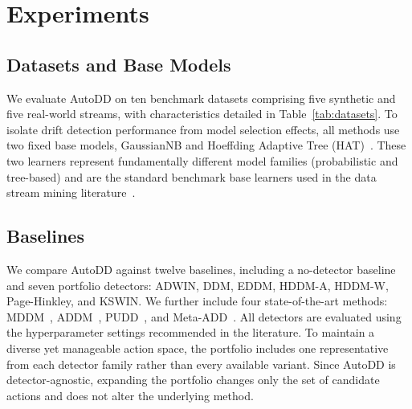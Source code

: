 \documentclass[conference]{IEEEtran}
\begin{document}
\section{Experiments}
\label{sec:experiments}

\subsection{Datasets and Base Models}
We evaluate AutoDD on ten benchmark datasets comprising five synthetic and five real-world streams, with characteristics detailed in Table~\ref{tab:datasets}. To isolate drift detection performance from model selection effects, all methods use two fixed base models, GaussianNB and Hoeffding Adaptive Tree (HAT)~\cite{Bifet2009HAT}. These two learners represent fundamentally different model families (probabilistic and tree-based) and are the standard benchmark base learners used in the data stream mining literature~\cite{Bifet2010MOA,Barros2018}.

\subsection{Baselines}
We compare AutoDD against twelve baselines, including a no-detector baseline and seven portfolio detectors: ADWIN, DDM, EDDM, HDDM-A, HDDM-W, Page-Hinkley, and KSWIN. We further include four state-of-the-art methods: MDDM~\cite{Pesaranghader2017MDDM}, ADDM~\cite{Mayaki2022ADDM}, PUDD~\cite{Lu2025PUDD}, and Meta-ADD~\cite{Yu2021MetaADD}. All detectors are evaluated using the hyperparameter settings recommended in the literature. To maintain a diverse yet manageable action space, the portfolio includes one representative from each detector family rather than every available variant. Since AutoDD is detector-agnostic, expanding the portfolio changes only the set of candidate actions and does not alter the underlying method.
\end{document}
